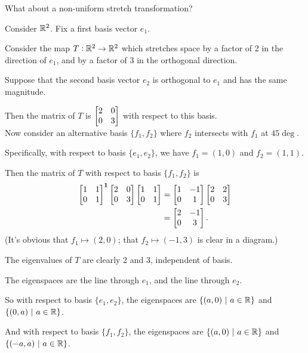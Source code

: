 What about a non-uniform stretch transformation?

\newpage
Consider $\mathbb{R}^2$. Fix a first basis vector $e_1$.

Consider the map $T:\mathbb{R}^2\to\mathbb{R}^2$ which stretches space by a factor of 2 in the
direction of $e_1$, and by a factor of 3 in the orthogonal direction.

Suppose that the second basis vector $e_2$ is orthogonal to $e_1$ and has the
same magnitude.

Then the matrix of $T$ is $\begin{bmatrix}2 & 0\\0 & 3\\ \end{bmatrix}$ with respect to this basis.
~\\

Now consider an alternative basis $\{f_1, f_2\}$ where $f_2$ intersects with
$f_1$ at $45\deg$.

Specifically, with respect to basis $\{e_1, e_2\}$, we have $f_1 = (1, 0)$ and
$f_2 = (1, 1)$.

Then the matrix of $T$ with respect to basis $\{f_1, f_2\}$ is
\begin{align*}
  \begin{bmatrix}1 & 1\\0 & 1\\ \end{bmatrix}^{\mathbf 1} \begin{bmatrix}2 & 0\\0 & 3\\ \end{bmatrix} \begin{bmatrix}1 & 1\\0 & 1\\ \end{bmatrix} &=
  \begin{bmatrix}1 & -1\\0 & 1\\ \end{bmatrix}  \begin{bmatrix}2 & 2\\0 & 3\\ \end{bmatrix} \\ &=
  \begin{bmatrix}2 & -1\\0 & 3\\ \end{bmatrix}.
\end{align*}
(It's obvious that $f_1 \mapsto (2, 0)$; that $f_2 \mapsto (-1, 3)$ is clear in
a diagram.)

The eigenvalues of $T$ are clearly 2 and 3, independent of basis.

The eigenspaces are the line through $e_1$, and the line through $e_2$.

So with respect to basis $\{e_1, e_2\}$, the eigenspaces are
$\{(a, 0) ~|~ a \in \mathbb{R}\}$ and $\{(0, a) ~|~ a \in \mathbb{R}\}$.

And with respect to basis $\{f_1, f_2\}$, the eigenspaces are
$\{(a, 0) ~|~ a \in \mathbb{R}\}$ and $\{(-a, a) ~|~ a \in \mathbb{R}\}$.


